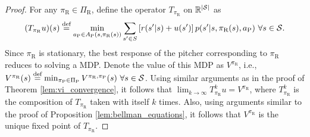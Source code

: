 \documentclass[11pt]{article}
\newcommand{\defeq}{\stackrel{\text{def}}{=}}
\newcommand{\abs}[1]{\left\lvert#1\right\rvert}
\begin{document}
       \begin{proof}
           For any $\pi_\text{R} \in \Pi_\text{R}$, define the operator $T_{\pi_\text{R}}$ on $\mathbb{R}^{\abs{\cal S}}$ as 
           \begingroup
           \allowdisplaybreaks
           \begin{equation}
               \label{eqn:policy_iteration_temp1}
               (T_{\pi_\text{R}} u )(s) \defeq \min_{a_\text{P} \in A_\text{P}(s,\pi_\text{R}(s))}\sum_{s' \in S}\left[r(s'|s) + u(s')\right]p(s'|s,\pi_\text{R}(s),a_\text{P}) \ \forall s \in {\cal S}.
           \end{equation}
           \endgroup
           Since $\pi_\text{R}$ is stationary, the best response of the pitcher corresponding to $\pi_\text{R}$ reduces to solving a MDP. Denote the value of this MDP as $V^{\pi_\text{R}}$, i.e., $V^{\pi_\text{R}}(s) \defeq \min_{\pi_\text{P} \in \Pi_\text{P}} V^{\pi_\text{R},\pi_\text{P}}(s) \ \forall s \in {\cal S}$. Using similar arguments as in the proof of Theorem  \ref{lem:vi_convergence}, it follows that $\lim_{k \to \infty}T_{\pi_\text{R}}^k u = V^{\pi_\text{R}}$, where $T_{\pi_\text{R}}^k$ is the composition of $T_{\pi_\text{R}}$ taken with itself $k$ times.  Also, using arguments similar to the proof of Proposition  \ref{lem:bellman_equations}, it follows that $V^{\pi_\text{R}}$ is the unique fixed point of $T_{\pi_\text{R}}$.
    

\end{proof}
\end{document}
